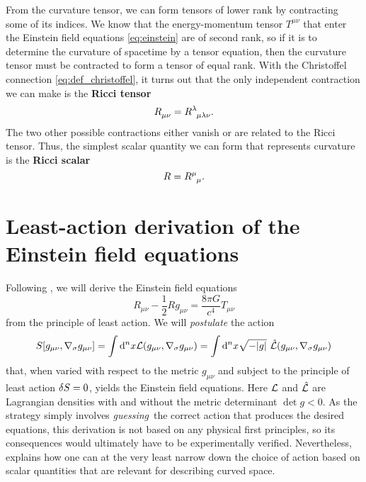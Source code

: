 From the curvature tensor, we can form tensors of lower rank by contracting some of its indices.
We know that the energy-momentum tensor $T^{\mu \nu}$ that enter the Einstein field equations \eqref{eq:einstein} are of second rank, so if it is to determine the curvature of spacetime by a tensor equation, then the curvature tensor must be contracted to form a tensor of equal rank.
With the Christoffel connection \cref{eq:def_christoffel}, it turns out that the only independent contraction we can make is the \textbf{Ricci tensor}
\begin{equation}
	R\indices{_\mu_\nu} = R\indices{^\lambda_\mu_\lambda_\nu} .
	\label{eq:def_ricci_tensor}
\end{equation}
The two other possible contractions either vanish or are related to the Ricci tensor.
Thus, the simplest scalar quantity we can form that represents curvature is the \textbf{Ricci scalar}
\begin{equation}
	R = R\indices{^\mu_\mu} .
	\label{eq:def_ricci_scalar}
\end{equation}



\section{Least-action derivation of the Einstein field equations}
\label{sec:einstein_derivation}

Following \cite[section 4.3]{ref:carroll}, we will derive the Einstein field equations
\begin{equation}
	R_{\mu \nu} - \frac{1}{2} R g_{\mu \nu} = \frac{8 \pi G}{c^4} T_{\mu \nu}
\end{equation}
from the principle of least action.
We will \emph{postulate} the action
\begin{equation}
	S[g_{\mu \nu}, \nabla_\sigma g_{\mu \nu}] = \int \dif^n x \lagr(g_{\mu \nu}, \nabla_\sigma g_{\mu \nu})
	                                          = \int \dif^n x \sqrt{-\det{g}} \hat{\lagr}(g_{\mu \nu}, \nabla_\sigma g_{\mu \nu})
\end{equation}
that, when varied with respect to the metric $g_{\mu \nu}$ and subject to the principle of least action $\delta S = 0$, yields the Einstein field equations.
Here $\mathcal{L}$ and $\hat{\mathcal{L}}$ are Lagrangian densities with and without the metric determinant $\det{g} < 0$.
As the strategy simply involves \emph{guessing} the correct action that produces the desired equations, this derivation is not based on any physical first principles, so its consequences would ultimately have to be experimentally verified.
Nevertheless, \cite[page 160-161]{ref:carroll} explains how one can at the very least narrow down the choice of action based on scalar quantities that are relevant for describing curved space.

